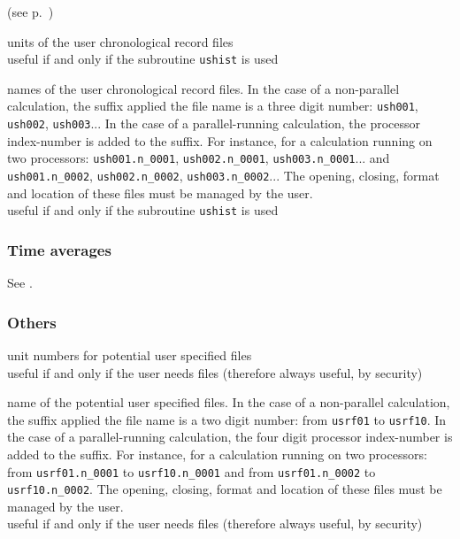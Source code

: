 (see p.~\pageref{sec:prg_ushist})

{units of the user chronological record files\\
useful if and only if the subroutine \texttt{ushist} is used}

{names of the user chronological record files.
In the case of a non-parallel calculation, the suffix applied the file
name is a three digit number: \texttt{ush001}, \texttt{ush002},
\texttt{ush003}...
In the case of a parallel-running calculation, the processor
index-number is added to the suffix. For instance, for a calculation
running on two processors:  \texttt{ush001.n\_0001},
\texttt{ush002.n\_0001}, \texttt{ush003.n\_0001}... and
\texttt{ush001.n\_0002},
\texttt{ush002.n\_0002}, \texttt{ush003.n\_0002}...
The opening, closing, format and location of these files must be managed
by the user.\\
useful if and only if the subroutine \texttt{ushist} is used}

\subsubsection{Time averages}
See .  

\subsubsection{Others}

{unit numbers for potential user specified files\\
useful if and only if the user needs files (therefore always useful, by security)}

{name of the potential user specified files. In the case of a non-parallel
calculation, the suffix applied the file name is a two digit number:
from \texttt{usrf01} to \texttt{usrf10}. In the case of a
parallel-running calculation, the four digit processor index-number is
added to the suffix. For instance, for a calculation running on two
processors: from \texttt{usrf01.n\_0001} to \texttt{usrf10.n\_0001} and
from \texttt{usrf01.n\_0002} to \texttt{usrf10.n\_0002}. The opening,
closing, format and location of these files must be managed by the user.\\
useful if and only if the user needs files (therefore always useful, by security)}

